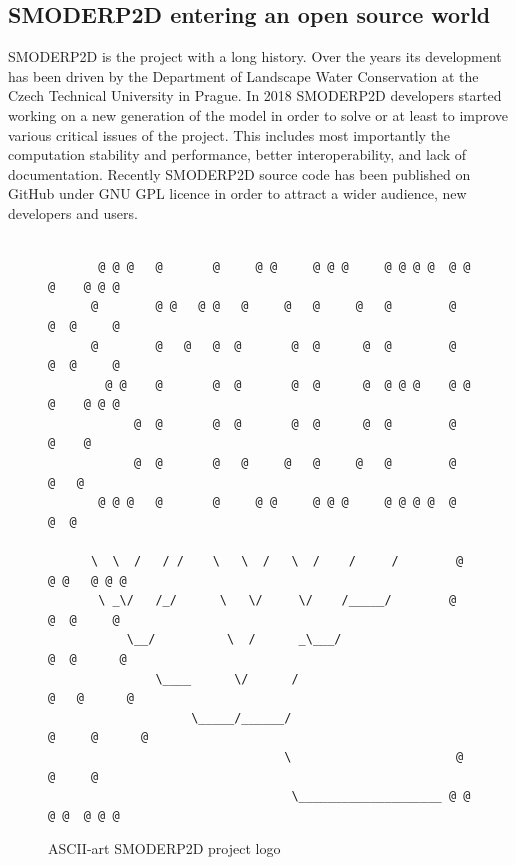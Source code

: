 \subsection{SMODERP2D entering an open source world}\label{ref:open_source_providers}

SMODERP2D is the project with a long history. Over the years its
development has been driven by the Department of Landscape Water
Conservation at the Czech Technical University in Prague. In 2018
SMODERP2D developers started working on a new generation of the model
in order to solve or at least to improve various critical issues of
the project. This includes most importantly the computation stability
and performance, better interoperability, and lack of
documentation. Recently SMODERP2D source code has been published on
GitHub \cite{smoderp2d-github-2019} under GNU GPL licence in order to
attract a wider audience, new developers and users.

\begin{figure}[ht!]
  {\tiny
\begin{verbatim}

       @ @ @   @       @     @ @     @ @ @     @ @ @ @  @ @ @    @ @ @
      @        @ @   @ @   @     @   @     @   @        @     @  @     @
      @        @   @   @  @       @  @      @  @        @     @  @     @
        @ @    @       @  @       @  @      @  @ @ @    @ @ @    @ @ @
            @  @       @  @       @  @      @  @        @   @    @
            @  @       @   @     @   @     @   @        @    @   @
       @ @ @   @       @     @ @     @ @ @     @ @ @ @  @     @  @

      \  \  /   / /    \   \  /   \  /    /     /        @ @ @   @ @ @
       \ _\/   /_/      \   \/     \/    /_____/        @     @  @     @
           \__/          \  /      _\___/                     @  @      @
               \____      \/      /                          @   @      @
                    \_____/______/                         @     @      @
                                 \                       @       @     @
                                  \____________________ @ @ @ @  @ @ @
\end{verbatim}
}
\caption{ASCII-art SMODERP2D project logo}
\label{fig:smoderp2d_logo}
\end{figure}

